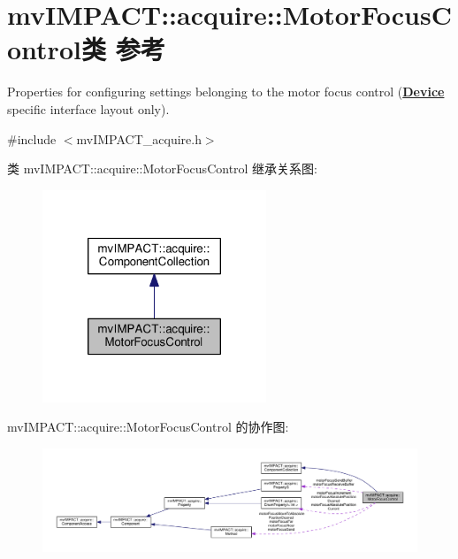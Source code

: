\hypertarget{classmv_i_m_p_a_c_t_1_1acquire_1_1_motor_focus_control}{\section{mv\+I\+M\+P\+A\+C\+T\+:\+:acquire\+:\+:Motor\+Focus\+Control类 参考}
\label{classmv_i_m_p_a_c_t_1_1acquire_1_1_motor_focus_control}
}


Properties for configuring settings belonging to the motor focus control ({\bfseries \hyperlink{classmv_i_m_p_a_c_t_1_1acquire_1_1_device}{Device}} specific interface layout only).  




{\ttfamily \#include $<$mv\+I\+M\+P\+A\+C\+T\+\_\+acquire.\+h$>$}



类 mv\+I\+M\+P\+A\+C\+T\+:\+:acquire\+:\+:Motor\+Focus\+Control 继承关系图\+:
\nopagebreak
\begin{figure}[H]
\begin{center}
\leavevmode
\includegraphics[width=190pt]{classmv_i_m_p_a_c_t_1_1acquire_1_1_motor_focus_control__inherit__graph}
\end{center}
\end{figure}


mv\+I\+M\+P\+A\+C\+T\+:\+:acquire\+:\+:Motor\+Focus\+Control 的协作图\+:
\nopagebreak
\begin{figure}[H]
\begin{center}
\leavevmode
\includegraphics[width=350pt]{classmv_i_m_p_a_c_t_1_1acquire_1_1_motor_focus_control__coll__graph}
\end{center}
\end{figure}
